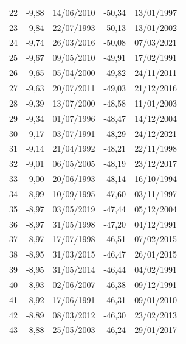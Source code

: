 \documentclass[a4paper,11pt]{extarticle}
\begin{document}
\begin{longtable}{|r|rl|rl|}
22        & -9,88           & 14/06/2010     & -50,34          & 13/01/1997     \\
23        & -9,84           & 22/07/1993     & -50,13          & 13/01/2002     \\
24        & -9,74           & 26/03/2016     & -50,08          & 07/03/2021     \\
25        & -9,67           & 09/05/2010     & -49,91          & 17/02/1991     \\
26        & -9,65           & 05/04/2000     & -49,82          & 24/11/2011     \\
27        & -9,63           & 20/07/2011     & -49,03          & 21/12/2016     \\
28        & -9,39           & 13/07/2000     & -48,58          & 11/01/2003     \\
29        & -9,34           & 01/07/1996     & -48,47          & 14/12/2004     \\
30        & -9,17           & 03/07/1991     & -48,29          & 24/12/2021     \\
31        & -9,14           & 21/04/1992     & -48,21          & 22/11/1998     \\
32        & -9,01           & 06/05/2005     & -48,19          & 23/12/2017     \\
33        & -9,00           & 20/06/1993     & -48,14          & 16/10/1994     \\
34        & -8,99           & 10/09/1995     & -47,60          & 03/11/1997     \\
35        & -8,97           & 03/05/2019     & -47,44          & 05/12/2004     \\
36        & -8,97           & 31/05/1998     & -47,20          & 04/12/1991     \\
37        & -8,97           & 17/07/1998     & -46,51          & 07/02/2015     \\
38        & -8,95           & 31/03/2015     & -46,47          & 26/01/2015     \\
39        & -8,95           & 31/05/2014     & -46,44          & 04/02/1991     \\
40        & -8,93           & 02/06/2007     & -46,38          & 09/12/1991     \\
41        & -8,92           & 17/06/1991     & -46,31          & 09/01/2010     \\
42        & -8,89           & 08/03/2012     & -46,30          & 23/02/2013     \\
43        & -8,88           & 25/05/2003     & -46,24          & 29/01/2017     \\

\end{longtable}
\end{document}
